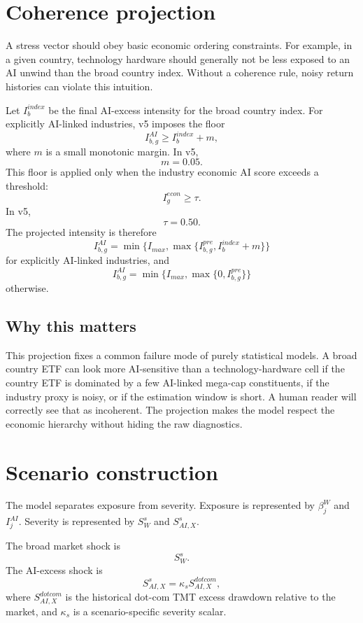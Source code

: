 \documentclass[11pt]{article}
\begin{document}
\section{Coherence projection}

A stress vector should obey basic economic ordering constraints. For example, in a given country, technology hardware should generally not be less exposed to an AI unwind than the broad country index. Without a coherence rule, noisy return histories can violate this intuition.

Let $I_b^{index}$ be the final AI-excess intensity for the broad country index. For explicitly AI-linked industries, v5 imposes the floor
\[
I_{b,g}^{AI}\geq I_b^{index}+m,
\]
where $m$ is a small monotonic margin. In v5,
\[
m=0.05.
\]
This floor is applied only when the industry economic AI score exceeds a threshold:
\[
I_g^{econ}\geq \tau.
\]
In v5,
\[
\tau=0.50.
\]
The projected intensity is therefore
\[
I_{b,g}^{AI}
=
\min\{I_{max},\max\{I_{b,g}^{pre}, I_b^{index}+m\}\}
\]
for explicitly AI-linked industries, and
\[
I_{b,g}^{AI}
=
\min\{I_{max},\max\{0,I_{b,g}^{pre}\}\}
\]
otherwise.

\subsection*{Why this matters}

This projection fixes a common failure mode of purely statistical models. A broad country ETF can look more AI-sensitive than a technology-hardware cell if the country ETF is dominated by a few AI-linked mega-cap constituents, if the industry proxy is noisy, or if the estimation window is short. A human reader will correctly see that as incoherent. The projection makes the model respect the economic hierarchy without hiding the raw diagnostics.

\section{Scenario construction}

The model separates exposure from severity. Exposure is represented by $\beta_j^W$ and $I_j^{AI}$. Severity is represented by $S_W^s$ and $S_{AI,X}^s$.

The broad market shock is
\[
S_W^s.
\]
The AI-excess shock is
\[
S_{AI,X}^s=\kappa_s S_{AI,X}^{dotcom},
\]
where $S_{AI,X}^{dotcom}$ is the historical dot-com TMT excess drawdown relative to the market, and $\kappa_s$ is a scenario-specific severity scalar.
\end{document}

